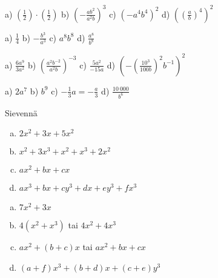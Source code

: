     \begin{tehtava}
        a) $(\frac{1}{2})\cdot(\frac{1}{2})$ \qquad
        b) $(-\frac{ab^2}{a^2b})^3$ \qquad
        c) $(-a^4b^4)^2$ \qquad
        d) $\left((\frac{a}{b})^4\right)^2$
        
        \begin{vastaus}
            a) $\frac{1}{4}$ \qquad
            b) $-\frac{b^3}{a^3}$ \qquad
            c) $a^8b^8$ \qquad
            d) $\frac{a^8}{b^8}$
        \end{vastaus}
    \end{tehtava}
    
    \begin{tehtava}
        a) $\frac{6a^9}{3a^2}$ \qquad
        b) $(\frac{a^2b^{-2}}{a^2b})^{-3}$ \qquad
        c) $\frac{5a^2}{-15a}$ \qquad
        d) $\left(-(\frac{10^3}{100b})^2 b^{-1} \right )^2$
        
        \begin{vastaus}
            a) $2a^7$ \qquad
            b) $b^9$ \qquad
            c) $-\frac{1}{3}a = -\frac{a}{3}$ \qquad
            d) $\frac{10\ 000}{b^6}$
        \end{vastaus}
    \end{tehtava}


\begin{tehtava}
Sievennä
	\begin{enumerate}[a)]
	\item $2x^2+3x+5x^2$
	\item $x^2+3x^3+x^2+x^3+2x^2$
	\item $ax^2+bx+cx$
	\item $ax^3+bx+cy^3+dx+ey^3+fx^3$
	\end{enumerate}

\begin{vastaus}
	\begin{enumerate}[a)]
	\item $7x^2+3x$
	\item $4(x^2+x^3)$ tai $4x^2+4x^3$
	\item $ax^2+(b+c)x$ tai $ax^2+bx+cx$
	\item $(a+f)x^3+(b+d)x+(c+e)y^3$
	\end{enumerate}
\end{vastaus}
\end{tehtava}

